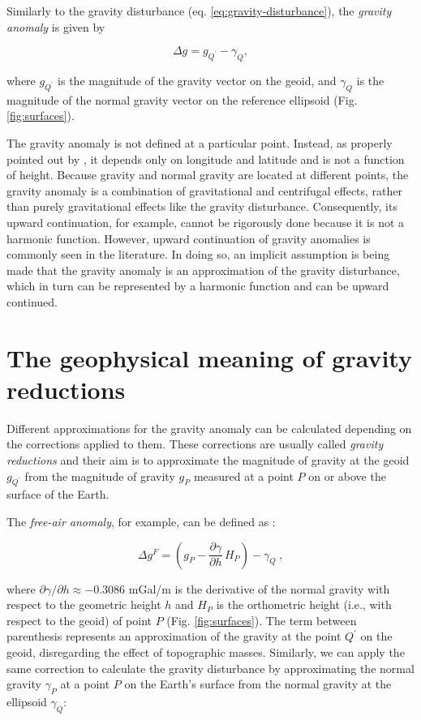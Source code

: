 \documentclass[extra]{gji}
\begin{document}
Similarly to the gravity disturbance (eq. \ref{eq:gravity-disturbance}),
the \textit{gravity anomaly} is given by

\begin{equation}
\Delta g = g_{Q^{\prime}} - \gamma_{Q} ,
\label{eq:gravity-anomaly}
\end{equation}

\noindent
where $g_{Q^{\prime}}$ is the magnitude of the gravity vector on the geoid,
and $\gamma_{Q}$ is the magnitude of the normal gravity vector
on the reference ellipsoid (Fig. \ref{fig:surfaces}).

The gravity anomaly is not defined at a particular point.
Instead, as properly pointed out by \citet{barthelmes2013},
it depends only on longitude and latitude and is not a function of height.
Because gravity and normal gravity are located at different points,
the gravity anomaly is a combination of gravitational and centrifugal effects,
rather than purely gravitational effects like the gravity disturbance.
Consequently, its upward continuation, for example, cannot be rigorously done
because it is not a harmonic function.
However, upward continuation of gravity anomalies is commonly seen in the
literature.
In doing so, an implicit assumption is being made that the gravity anomaly is
an approximation of the gravity disturbance,
which in turn can be represented by a harmonic function and can be upward
continued.


\section{The geophysical meaning of gravity reductions}

Different approximations for the gravity anomaly can be calculated
depending on the corrections applied to them.
These corrections are usually called \textit{gravity reductions}
and their aim is to approximate the magnitude of gravity at the geoid
$g_{Q^\prime}$ from the magnitude of gravity $g_P$ measured at a point $P$
on or above the surface of the Earth.

The \textit{free-air anomaly}, for example, can be defined as
\citep{blakely1996, hofmann-wellenhof-moritz2005}:

\begin{equation}
\Delta g^{F}
= \left(g_{P} - \frac{\partial \gamma}{\partial h} \, H_{P} \right)
- \gamma_{Q} \: ,
\label{eq:free-air-anomaly}
\end{equation}

\noindent
where $\partial \gamma/\partial h \approx -0.3086$ mGal/m is the
derivative of the normal gravity with respect to the geometric height $h$
and $H_{P}$ is the orthometric height (i.e., with respect to the geoid)
of point $P$ (Fig. \ref{fig:surfaces}).
The term between parenthesis represents an
approximation of the gravity at the point $Q^{\prime}$ on the geoid,
disregarding the effect of topographic masses.
Similarly, we can apply the same correction
to calculate the gravity disturbance by
approximating the normal gravity $\gamma_{P}$
at a point $P$ on the Earth's surface
from the normal gravity at the ellipsoid $\gamma_{Q}$:
\end{document}

